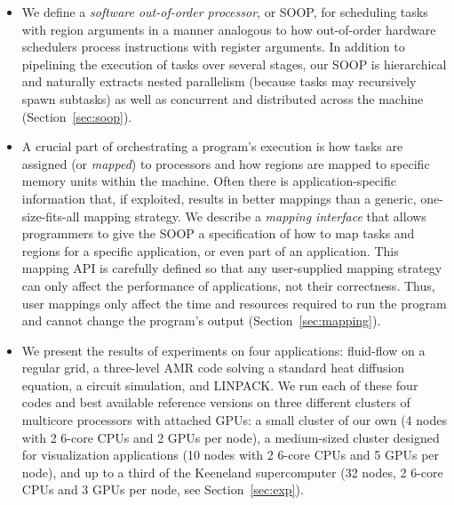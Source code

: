 \documentclass[conference]{IEEEtran}
\begin{document}
\begin{itemize}

\item We define a {\em software out-of-order processor}, or SOOP, for
  scheduling tasks with region arguments in a manner analogous to how
  out-of-order hardware schedulers process instructions with register
  arguments.  In addition to pipelining the execution of tasks over
  several stages, our SOOP is hierarchical and naturally extracts nested
  parallelism (because tasks may recursively spawn subtasks) as well
  as concurrent and distributed across the machine
  (Section~\ref{sec:soop}).

\item A crucial part of orchestrating a program's execution is how
tasks are assigned (or {\em mapped}) to processors and how regions are
mapped to specific memory units within the machine.  Often there is
application-specific information that, if exploited, results in better
mappings than a generic, one-size-fits-all mapping strategy.  We describe
a {\em mapping interface} that allows programmers to give the SOOP a specification
of how to map tasks and regions for a specific application, or even part of an
application.  This mapping API is carefully defined so that
any user-supplied mapping strategy can only affect the performance of applications,
not their correctness.  Thus, user mappings only affect the time and resources required
to run the program and cannot change the program's output (Section~\ref{sec:mapping}).

\item We present the results of experiments on four applications:
  fluid-flow on a regular grid, a three-level AMR code solving a
  standard heat diffusion equation, a circuit simulation, and LINPACK.
  We run each of these four codes and best available reference
  versions on three different clusters of multicore processors with
  attached GPUs: a small cluster of our own (4 nodes with 2 6-core CPUs and 2 GPUs per node), a medium-sized cluster
  designed for visualization applications (10 nodes with 2 6-core CPUs and 5 GPUs per node), and up to a third of the
  Keeneland supercomputer (32 nodes, 2 6-core CPUs and 3 GPUs per node, see Section~\ref{sec:exp}).


\end{itemize}










%




\end{document}
